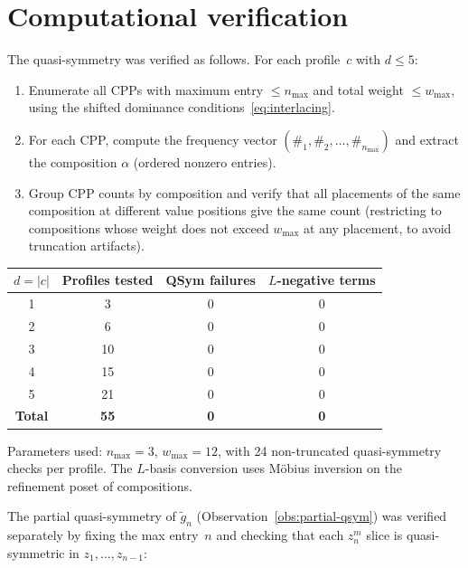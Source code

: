 \documentclass[11pt]{article}
\begin{document}
\section{Computational verification}
\label{sec:computation}

The quasi-symmetry was verified as follows. For each profile~$c$
with $d \leq 5$:

\begin{enumerate}
  \item Enumerate all CPPs with maximum entry $\leq n_{\max}$ and
    total weight $\leq w_{\max}$, using the shifted dominance
    conditions~\eqref{eq:interlacing}.
  \item For each CPP, compute the frequency vector
    $(\#_1, \#_2, \ldots, \#_{n_{\max}})$ and extract the
    composition $\alpha$ (ordered nonzero entries).
  \item Group CPP counts by composition and verify that
    all placements of the same composition at different
    value positions give the same count (restricting to
    compositions whose weight does not exceed $w_{\max}$ at
    any placement, to avoid truncation artifacts).
\end{enumerate}

\begin{center}
\begin{tabular}{c|c|c|c}
  $d = |c|$ & Profiles tested & QSym failures & $L$-negative terms \\
  \hline
  1 & 3 & 0 & 0 \\
  2 & 6 & 0 & 0 \\
  3 & 10 & 0 & 0 \\
  4 & 15 & 0 & 0 \\
  5 & 21 & 0 & 0 \\
  \hline
  \textbf{Total} & \textbf{55} & \textbf{0} & \textbf{0}
\end{tabular}
\end{center}

Parameters used: $n_{\max} = 3$, $w_{\max} = 12$,
with 24 non-truncated quasi-symmetry checks per profile.
The $L$-basis conversion uses M\"obius inversion on the
refinement poset of compositions.

\medskip

The partial quasi-symmetry of
$\tilde{g}_n$ (Observation~\ref{obs:partial-qsym})
was verified separately by fixing the max entry~$n$
and checking that each $z_n^m$ slice is quasi-symmetric
in $z_1, \ldots, z_{n-1}$:
\end{document}
